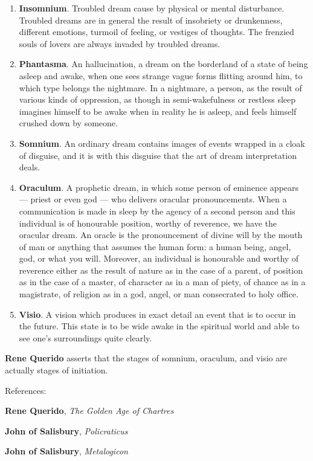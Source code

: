 \begin{enumerate}
\item \textbf{Insomnium}. Troubled dream cause by physical or mental disturbance. Troubled dreams are in general the result of insobriety or drunkenness, different emotions, turmoil of feeling, or vestiges of thoughts. The frenzied souls of lovers are always invaded by troubled dreams. 
\item \textbf{Phantasma}. An hallucination, a dream on the borderland of a state of being asleep and awake, when one sees strange vague forms flitting around him, to which type belongs the nightmare. In a nightmare, a person, as the result of various kinds of oppression, as though in semi-wakefulness or restless sleep imagines himself to be awake when in reality he is asleep, and feels himself crushed down by someone. 
\item \textbf{Somnium}. An ordinary dream contains images of events wrapped in a cloak of disguise, and it is with this disguise that the art of dream interpretation deals. 
\item \textbf{Oraculum}. A prophetic dream, in which some person of eminence appears — priest or even god — who delivers oracular pronouncements. When a communication is made in sleep by the agency of a second person and this individual is of honourable position, worthy of reverence, we have the oracular dream. An oracle is the pronouncement of divine will by the mouth of man or anything that assumes the human form: a human being, angel, god, or what you will. Moreover, an individual is honourable and worthy of reverence either as the result of nature as in the case of a parent, of position as in the case of a master, of character as in a man of piety, of chance as in a magistrate, of religion as in a god, angel, or man consecrated to holy office. 
\item \textbf{Visio}. A vision which produces in exact detail an event that is to occur in the future. This state is to be wide awake in the spiritual world and able to see one's surroundings quite clearly. 
\end{enumerate}
\textbf{Rene Querido} asserts that the stages of somnium, oraculum, and visio are actually stages of initiation.



References:

\textbf{Rene Querido}, \emph{The Golden Age of Chartres}

\textbf{John of Salisbury}, \emph{Policraticus}

\textbf{John of Salisbury}, \emph{Metalogicon}



